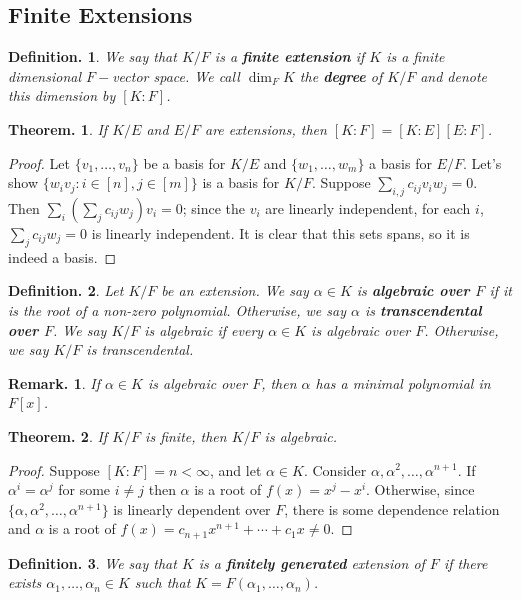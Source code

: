 \documentclass[11pt, a4paper]{memoir}
\newcommand{\mbf}[1]{{\boldmath\bfseries #1}}
\theoremstyle{change}
\newtheorem{theorem}{Theorem.}[section]
\theoremstyle{plain}
\theoremstyle{nonumberplain}
\newtheorem{definition}{Definition.}
\newtheorem{remark}{Remark.}
\newtheorem{proof}{Proof}
\numberwithin{equation}{section}
\begin{document}
\subsection{Finite Extensions}
\begin{definition}
    We say that $K/F$ is a \mbf{finite extension} if $K$ is a finite dimensional $F-$vector space.
    We call $\dim_F K$ the \mbf{degree} of $K/F$ and denote this dimension by $[K:F]$.
\end{definition}
\begin{theorem}
    If $K/E$ and $E/F$ are extensions, then $[K:F]=[K:E][E:F]$.
\end{theorem}
\begin{proof}
    Let $\{v_1,\ldots,v_n\}$ be a basis for $K/E$ and $\{w_1,\ldots,w_m\}$ a basis for $E/F$.
    Let's show $\{w_iv_j:i\in[n],j\in[m]\}$ is a basis for $K/F$.
    Suppose $\sum_{i,j}c_{ij}v_iw_j=0$.
    Then $\sum_i\left(\sum_j c_{ij}w_j\right)v_i=0$; since the $v_i$ are linearly independent, for each $i$, $\sum_j c_{ij}w_j=0$ is linearly independent.
    It is clear that this sets spans, so it is indeed a basis.
\end{proof}
\begin{definition}
    Let $K/F$ be an extension.
    We say $\alpha\in K$ is \mbf{algebraic over $F$} if it is the root of a non-zero polynomial.
    Otherwise, we say $\alpha$ is \mbf{transcendental over $F$}.
    We say $K/F$ is algebraic if every $\alpha\in K$ is algebraic over $F$.
    Otherwise, we say $K/F$ is transcendental.
\end{definition}
\begin{remark}
    If $\alpha\in K$ is algebraic over $F$, then $\alpha$ has a minimal polynomial in $F[x]$.
\end{remark}
\begin{theorem}
    If $K/F$ is finite, then $K/F$ is algebraic.
\end{theorem}
\begin{proof}
    Suppose $[K:F]=n<\infty$, and let $\alpha\in K$.
    Consider $\alpha,\alpha^2,\ldots,\alpha^{n+1}$.
    If $\alpha^i=\alpha^j$ for some $i\neq j$ then $\alpha$ is a root of $f(x)=x^j-x^i$.
    Otherwise, since $\{\alpha,\alpha^2,\ldots,\alpha^{n+1}\}$ is linearly dependent over $F$, there is some dependence relation and $\alpha$ is a root of $f(x)=c_{n+1}x^{n+1}+\cdots+c_1x\neq 0$.
\end{proof}
\begin{definition}
    We say that $K$ is a \mbf{finitely generated} extension of $F$ if there exists $\alpha_1,\ldots,\alpha_n\in K$ such that $K=F(\alpha_1,\ldots,\alpha_n)$.
\end{definition}
\end{document}
